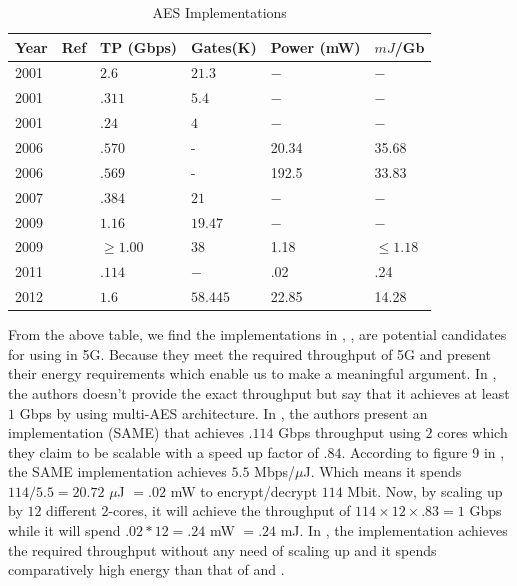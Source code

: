 \begin{table}
\begin{center}
\begin{tabular}{|p{}
				|p{}
				|p{}
				|p{}
				|p{}
				|p{}|
				}
\hline
Year & Ref & TP (Gbps) & Gates(K) & Power (mW) & $mJ$/Gb \\
\hline
2001 & \cite{IBM_Japan_2001} &$2.6$ &$21.3$  & $-$ & $-$ \\ \hline
2001 & \cite{IBM_Japan_2001} &$.311$ &$5.4$  & $-$ & $-$ \\ \hline
2001 & \cite{IBM_India_IIT_2001} &$.24$ &$4$  & $-$ & $-$ \\ \hline
2006 & \cite{Taiwan_2006} &$.570$ & - &20.34 & 35.68 \\ \hline
2006 & \cite{Taiwan_2006} &$.569$ & - &192.5 & 33.83 \\ \hline
2007 & \cite{IIT_Kharagpur_2007} &$.384$ &$21$ & $-$  & $-$ \\ \hline
2009 & \cite{IME_China_Tsinghua_Univerisity_2009} &$1.16$ &$19.47$ & $-$ & $-$ \\ \hline
2009 & \cite{Ruhr_2009} &$\geq 1.00$ &$38$ &1.18 & $\leq 1.18$ \\ \hline
2011 & \cite{Ruhr_2011} &$.114$ &$ - $ &.02 & .24 \\ \hline
2012 & \cite{Pune_2012} &$1.6$ &$58.445$ &22.85 & 14.28 \\ \hline
\end{tabular}
\end{center}
\caption{AES Implementations}
\end{table}
From the above table, we find the implementations in \cite{Ruhr_2009}, \cite{Ruhr_2011}, \cite{Pune_2012} are potential candidates for using in 5G. Because they meet the required throughput of 5G and present their energy requirements which enable us to make a meaningful argument. In \cite{Ruhr_2009}, the authors doesn't provide the exact throughput but say that it achieves at least $1$ Gbps by using multi-AES architecture. In \cite{Ruhr_2011}, the authors present an implementation (SAME) that achieves $.114$ Gbps throughput using $2$ cores which they claim to be scalable with a speed up factor of $.84$. According to figure 9 in \cite{Ruhr_2011}, the SAME implementation achieves $5.5$ Mbps/$\mu$J. Which means it spends $114/5.5 = 20.72$ $\mu$J $=.02$ mW to encrypt/decrypt $114$ Mbit. Now, by scaling up by $12$ different $2$-cores, it will achieve the throughput of $114 \times 12 \times .83 = 1$ Gbps while it will spend $.02*12=.24$ mW $=.24$ mJ. In \cite{Pune_2012}, the implementation achieves the required throughput without any need of scaling up and it spends comparatively high energy than that of \cite{Ruhr_2009} and \cite{Ruhr_2011}. 

